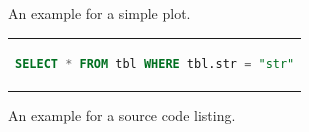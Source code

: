 \begin{figure}[htpb]
  \centering

  \exampleA
  \exampleB
  \caption[Example plot]{An example for a simple plot.}\label{fig:sample-plot}
\end{figure}

\begin{figure}[htpb]
  \centering
  \begin{tabular}{c}
  \begin{lstlisting}[language=SQL]
    SELECT * FROM tbl WHERE tbl.str = "str"
  \end{lstlisting}
  \end{tabular}
  \caption[Example listing]{An example for a source code listing.}\label{fig:sample-listing}
\end{figure}
